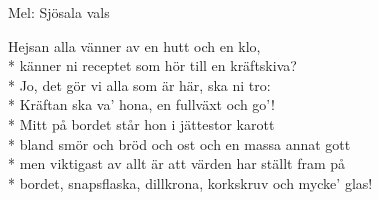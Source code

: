 \begin{SongText}
    \begin{SongInfo}
        Mel: Sjösala vals
    \end{SongInfo}
    \begin{SongVerse}
        Hejsan alla vänner av en hutt och en klo,\\*%
        känner ni receptet som hör till en kräftskiva?\\*%
        Jo, det gör vi alla som är här, ska ni tro:\\*%
        Kräftan ska va’ hona, en fullväxt och go’!\\*%
        Mitt på bordet står hon i jättestor karott\\*%
        bland smör och bröd och ost och en massa annat gott\\*%
        men viktigast av allt är att värden har ställt fram på\\*%
        bordet, snapsflaska, dillkrona, korkskruv och mycke’ glas!
    \end{SongVerse}
\end{SongText}
